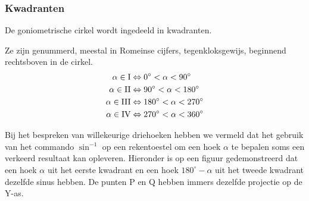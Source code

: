 \subsubsection{Kwadranten}

De goniometrische cirkel wordt ingedeeld in kwadranten.



Ze zijn genummerd, meestal in Romeinse cijfers, tegenkloksgewijs, beginnend rechtsboven in de cirkel.
\begin{align*}
\alpha \in \textup{I} &\Leftrightarrow 0^\circ < \alpha < 90^\circ\\
\alpha \in \textup{II} &\Leftrightarrow 90^\circ < \alpha < 180^\circ\\
\alpha \in \textup{III} &\Leftrightarrow 180^\circ < \alpha < 270^\circ\\
\alpha \in \textup{IV} &\Leftrightarrow 270^\circ < \alpha < 360^\circ
\end{align*}
\begin{opmerking}
	 Bij het bespreken van willekeurige driehoeken hebben we vermeld dat het gebruik van het commando $\sin^{-1}$ op een rekentoestel om een hoek $\alpha$ te bepalen soms een verkeerd resultaat kan opleveren. Hieronder is op een figuur gedemonstreerd dat een hoek $\alpha$ uit het eerste kwadrant en een hoek $180^\circ -\alpha$ uit het tweede kwadrant dezelfde sinus hebben. De punten P en Q hebben immers dezelfde projectie op de Y-as.

\end{opmerking}


